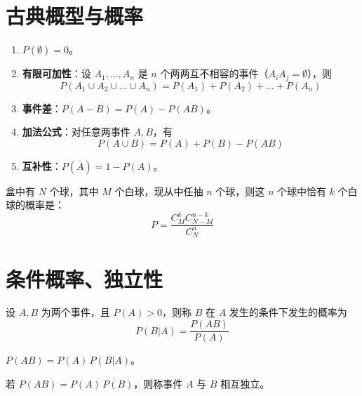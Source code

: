 \section{古典概型与概率}
\begin{property}[概率的性质]
\begin{enumerate}
	\item $P(\emptyset) = 0$。
	\item \textbf{有限可加性}：设 $A_1, \ldots, A_n$ 是 $n$ 个两两互不相容的事件（$A_i A_j = \emptyset$），则
	\begin{equation}
		P(A_1 \cup A_2 \cup \ldots \cup A_n) = P(A_1) + P(A_2) + \ldots + P(A_n)
		\label{eq:第一章:有限可加性}
	\end{equation}
	\item \textbf{事件差}：$P(A - B) = P(A) - P(AB)$。
	\item \textbf{加法公式}：对任意两事件 $A, B$，有
	\begin{equation}
		P(A \cup B) = P(A) + P(B) - P(AB)
		\label{eq:第一章:加法公式}
	\end{equation}
	\item \textbf{互补性}：$P(\bar{A}) = 1 - P(A)$。
\end{enumerate}
\end{property}

\begin{example}[古典概型抽球公式]
盒中有 $N$ 个球，其中 $M$ 个白球，现从中任抽 $n$ 个球，则这 $n$ 个球中恰有 $k$ 个白球的概率是：
\begin{equation}
	P = \frac{C_{M}^{k} C_{N-M}^{n-k}}{C_{N}^{n}}
	\label{eq:第一章:抽球公式}
\end{equation}
\end{example}

\section{条件概率、独立性}
\begin{definition}[条件概率]
设 $A, B$ 为两个事件，且 $P(A) > 0$，则称 $B$ 在 $A$ 发生的条件下发生的概率为
\begin{equation}
	P(B|A) = \frac{P(AB)}{P(A)}
	\label{eq:第一章:条件概率}
\end{equation}
\end{definition}

\begin{theorem}[乘法公式]
$P(AB) = P(A)\,P(B|A)$。
\end{theorem}

\begin{definition}[事件的独立性]
若 $P(AB) = P(A)\,P(B)$，则称事件 $A$ 与 $B$ 相互独立。
\end{definition}

